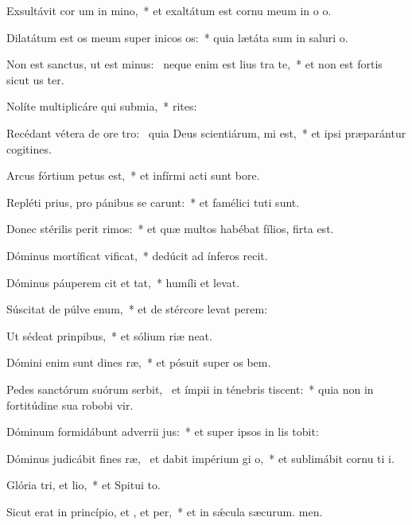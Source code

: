 \item Exsultávit cor um in mino,~* et exaltátum est cornu meum in o o.
\item Dilatátum est os meum super inicos os:~* quia lætáta sum in saluri o.
\item Non est sanctus, ut est minus:~\pscross{} neque enim est lius tra te,~* et non est fortis sicut us ter.
\item Nolíte multiplicáre qui submia,~* rites:
\item Recédant vétera de ore tro:~\pscross{} quia Deus scientiárum, mi est,~* et ipsi præparántur cogitines.
\item Arcus fórtium petus est,~* et infírmi acti sunt bore.
\item Repléti prius, pro pánibus se carunt:~* et famélici tuti sunt.
\item Donec stérilis perit rimos:~* et quæ multos habébat fílios, firta est.
\item Dóminus mortíficat  vificat,~* dedúcit ad ínferos  recit.
\item Dóminus páuperem cit et tat,~* humíli et levat.
\item Súscitat de púlve enum,~* et de stércore levat perem:
\item Ut sédeat  prinpibus,~* et sólium riæ neat.
\item Dómini enim sunt dines ræ,~* et pósuit super os bem.
\item Pedes sanctórum suórum serbit,~\pscross{} et ímpii in ténebris tiscent:~* quia non in fortitúdine sua robobi vir.
\item Dóminum formidábunt adverrii jus:~* et super ipsos in lis tobit:
\item Dóminus judicábit fines ræ,~\pscross{} et dabit impérium gi o,~* et sublimábit cornu ti i.
\item Glória tri, et lio,~* et Spitui to.
\item Sicut erat in princípio, et , et per,~* et in sǽcula sæcurum. men.
